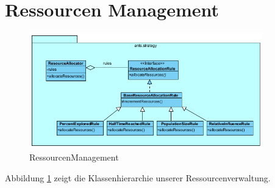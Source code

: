 \section{Ressourcen Management}
\label{sec:module.resourceMgmt}

\begin{figure}[H]
\centering
\includegraphics[width=0.9\textwidth]{91_bilder/antsStrategy}
\caption{RessourcenManagement}
\label{fig:antsStrategy}
\end{figure}
 
Abbildung \ref{fig:antsStrategy} zeigt die Klassenhierarchie unserer Ressourcenverwaltung.